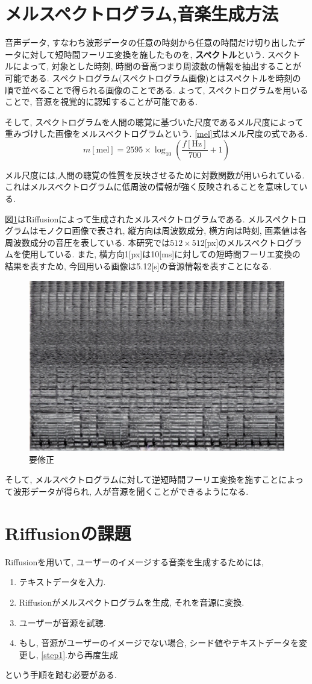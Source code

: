 \documentclass[a4paper,11pt,dvipdfmx]{jreport}
\begin{document}
\section{メルスペクトログラム,音楽生成方法}
音声データ, すなわち波形データの任意の時刻から任意の時間だけ切り出したデータに対して短時間フーリエ変換を施したものを, \textbf{スペクトル}という.
スペクトルによって, 対象とした時刻, 時間の音高つまり周波数の情報を抽出することが可能である.
スペクトログラム(スペクトログラム画像)とはスペクトルを時刻の順で並べることで得られる画像のことである.
よって, スペクトログラムを用いることで, 音源を視覚的に認知することが可能である.

そして, スペクトログラムを人間の聴覚に基づいた尺度であるメル尺度によって重みづけした画像をメルスペクトログラムという.
\ref{mel}式はメル尺度の式である.
\begin{equation}
  m[\mathrm{mel}] = 2595 \times \log_{10}\left( \frac{f[\mathrm{Hz}]}{700}+1\right) \label{mel}
\end{equation}

メル尺度には,人間の聴覚の性質を反映させるために対数関数が用いられている.
これはメルスペクトログラムに低周波の情報が強く反映されることを意味している.

\newpage
図\ref{melsp}はRiffusionによって生成されたメルスペクトログラムである.
メルスペクトログラムはモノクロ画像で表され, 縦方向は周波数成分, 横方向は時刻, 画素値は各周波数成分の音圧を表している.
本研究では$512\times 512$[px]のメルスペクトログラムを使用している.
また, 横方向1[px]は10[ms]に対しての短時間フーリエ変換の結果を表すため, 今回用いる画像は5.12[s]の音源情報を表すことになる.

\begin{figure}[htbp]
  \centering
  \includegraphics[width=0.4\linewidth]{energy_guitar.jpg}
  \caption{要修正}
  \label{melsp}
\end{figure}

そして, メルスペクトログラムに対して逆短時間フーリエ変換を施すことによって波形データが得られ, 
人が音源を聞くことができるようになる.

\section{Riffusionの課題}
Riffusionを用いて, ユーザーのイメージする音楽を生成するためには, 
\begin{enumerate}
  \item テキストデータを入力.\label{step1}
  \item Riffusionがメルスペクトログラムを生成, それを音源に変換.
  \item ユーザーが音源を試聴.
  \item もし, 音源がユーザーのイメージでない場合, シード値やテキストデータを変更し, \ref{step1}.から再度生成
\end{enumerate}
という手順を踏む必要がある.
\end{document}

